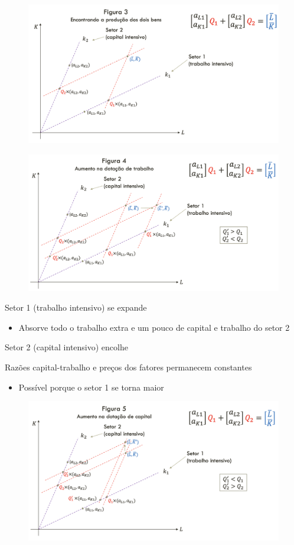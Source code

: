 \documentclass[a4paper,12pt]{article}[abntex2]
\begin{document}
\begin{figure}[H]
    \centering
    \includegraphics[width=0.7\linewidth]{Imagens/a11i3.png}
\end{figure}

\begin{figure}[H]
    \centering
    \includegraphics[width=0.7\linewidth]{Imagens/a11i4.png}
\end{figure}

Setor 1 (trabalho intensivo) se expande\begin{itemize}
    \item Absorve todo o trabalho extra e um pouco de capital e trabalho do setor 2
\end{itemize}

Setor 2 (capital intensivo) encolhe

Razões capital-trabalho e preços dos fatores permanecem constantes\begin{itemize}
    \item Possível porque o setor 1 se torna maior
\end{itemize}

\begin{figure}[H]
    \centering
    \includegraphics[width=0.7\linewidth]{Imagens/a11i5.png}
\end{figure}
\end{document}
